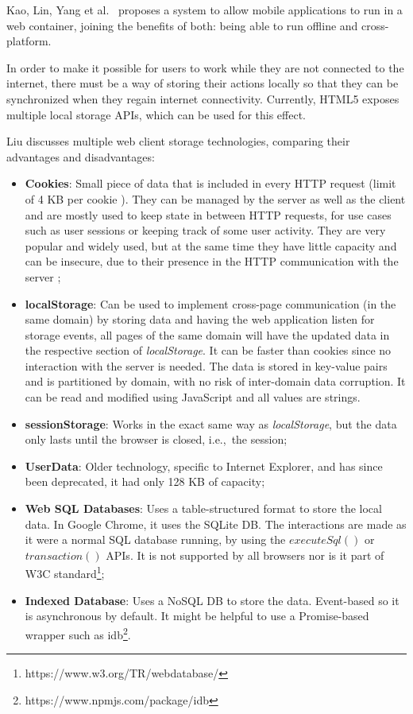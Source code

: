 Kao, Lin, Yang et al.\ \cite{Kao2012} proposes a system to allow mobile applications to run in a web container, joining the benefits of both: being able to run offline and cross-platform.

In order to make it possible for users to work while they are not connected to the internet, there must be a way of storing their actions locally so that they can be synchronized when they regain internet connectivity. Currently, HTML5 exposes multiple local storage APIs, which can be used for this effect.

Liu \cite{Liu2014} discusses multiple web client storage technologies, comparing their advantages and disadvantages:
\begin{itemize}
    \item \textbf{Cookies}: Small piece of data that is included in every HTTP request (limit of 4 KB per cookie \cite{cookies-rfc}). They can be managed by the server as well as the client and are mostly used to keep state in between HTTP requests, for use cases such as user sessions or keeping track of some user activity. They are very popular and widely used, but at the same time they have little capacity and can be insecure, due to their presence in the HTTP communication with the server \cite{Velagapudi2019} \cite{Kwon2020};
    \item \textbf{localStorage}: Can be used to implement cross-page communication (in the same domain) by storing data and having the web application listen for storage events, all pages of the same domain will have the updated data in the respective section of \textit{localStorage}. It can be faster than cookies since no interaction with the server is needed.
    The data is stored in key-value pairs and is partitioned by domain, with no risk of inter-domain data corruption. It can be read and modified using JavaScript and all values are strings.
    \item \textbf{sessionStorage}: Works in the exact same way as \textit{localStorage}, but the data only lasts until the browser is closed, i.e.,\ the session;
    \item \textbf{UserData}: Older technology, specific to Internet Explorer, and has since been deprecated, it had only 128 KB of capacity;
    \item \textbf{Web SQL Databases}: Uses a table-structured format to store the local data. In Google Chrome, it uses the SQLite DB. The interactions are made as it were a normal SQL database running, by using the $executeSql()$ or $transaction()$ APIs. It is not supported by all browsers nor is it part of W3C standard\footnote{https://www.w3.org/TR/webdatabase/};
    \item \textbf{Indexed Database}: Uses a NoSQL DB to store the data. Event-based so it is asynchronous by default. It might be helpful to use a Promise-based wrapper \cite{promises-js-mdn} such as idb\footnote{https://www.npmjs.com/package/idb}.
\end{itemize}
